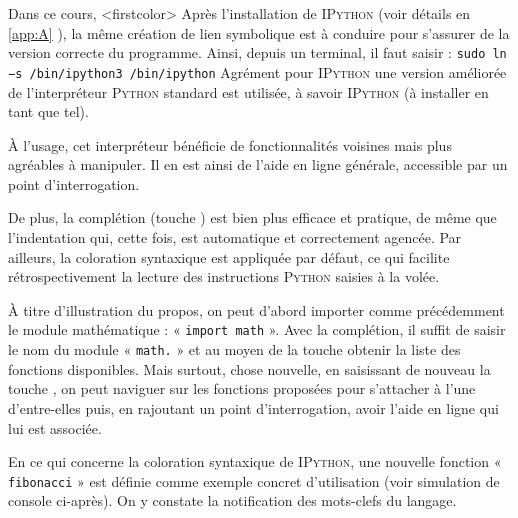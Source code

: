 Dans ce cours,%
\caution[t]<firstcolor>{%
Après l'installation de \textsc{IPython} (voir détails en \cref{app:A} ), la même création de lien symbolique est à conduire pour s'assurer de la version correcte du programme. Ainsi, depuis un terminal, il faut saisir :
\texttt{sudo ln −s /bin/ipython3 /bin/ipython}
}%
{Agrément pour \textsc{IPython}}
une version améliorée de l'interpréteur \textsc{Python} standard est utilisée, à savoir \textsc{IPython} (à installer en tant que tel).

À l'usage, cet interpréteur bénéficie de fonctionnalités voisines mais plus agréables à manipuler. Il en est ainsi de l'aide en ligne générale, accessible par un point d'interrogation. 

De plus, la complétion (touche ) est bien plus efficace et pratique, de même que l'indentation qui, cette fois, est automatique et correctement agencée. Par ailleurs, la coloration syntaxique est appliquée par défaut, ce qui facilite rétrospectivement la lecture des instructions \textsc{Python} saisies à la volée.

À titre d'illustration du propos, on peut d'abord importer comme précédemment le module mathématique : « \texttt{import math} ». Avec la complétion, il suffit de saisir le nom du module « \texttt{math.} » et au moyen de la touche  obtenir la liste des fonctions disponibles. Mais surtout, chose nouvelle, en saisissant de nouveau la touche , on peut naviguer sur les fonctions proposées pour s'attacher à l'une d'entre-elles puis, en rajoutant un point d'interrogation, avoir l'aide en ligne qui lui est associée.

En ce qui concerne la coloration syntaxique de \textsc{IPython}, une nouvelle fonction « \texttt{fibonacci} » est définie comme exemple concret d'utilisation (voir simulation de console ci-après). On y constate la notification des mots-clefs du langage.

\vspace*{4pt}

